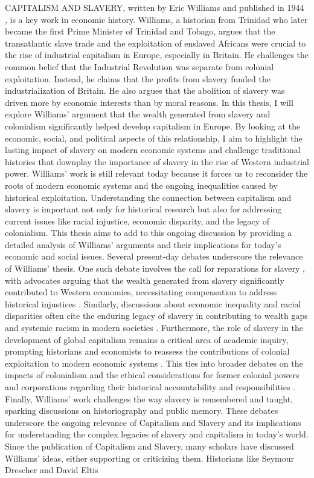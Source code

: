 CAPITALISM AND SLAVERY, written by Eric Williams and published in 1944 , is a key work in economic history. Williams, a historian from Trinidad who later became the first Prime Minister of Trinidad and Tobago, argues that the transatlantic slave trade and the exploitation of enslaved Africans were crucial to the rise of industrial capitalism in Europe, especially in Britain. He challenges the common belief that the Industrial Revolution was separate from colonial exploitation. Instead, he claims that the profits from slavery funded the industrialization of Britain. He also argues that the abolition of slavery was driven more by economic interests than by moral reasons. In this thesis, I will explore Williams' argument that the wealth generated from slavery and colonialism significantly helped develop capitalism in Europe. By looking at the economic, social, and political aspects of this relationship, I aim to highlight the lasting impact of slavery on modern economic systems and challenge traditional histories that downplay the importance of slavery in the rise of Western industrial power. Williams' work is still relevant today because it forces us to reconsider the roots of modern economic systems and the ongoing inequalities caused by historical exploitation. Understanding the connection between capitalism and slavery is important not only for historical research but also for addressing current issues like racial injustice, economic disparity, and the legacy of colonialism. This thesis aims to add to this ongoing discussion by providing a detailed analysis of Williams' arguments and their implications for today's economic and social issues. Several present-day debates underscore the relevance of Williams' thesis. One such debate involves the call for reparations for slavery , with advocates arguing that the wealth generated from slavery significantly contributed to Western economies, necessitating compensation to address historical injustices . Similarly, discussions about economic inequality and racial disparities often cite the enduring legacy of slavery in contributing to wealth gaps and systemic racism in modern societies . Furthermore, the role of slavery in the development of global capitalism remains a critical area of academic inquiry, prompting historians and economists to reassess the contributions of colonial exploitation to modern economic systems . This ties into broader debates on the impacts of colonialism and the ethical considerations for former colonial powers and corporations regarding their historical accountability and responsibilities . Finally, Williams' work challenges the way slavery is remembered and taught, sparking discussions on historiography and public memory. These debates underscore the ongoing relevance of Capitalism and Slavery and its implications for understanding the complex legacies of slavery and capitalism in today's world. Since the publication of Capitalism and Slavery, many scholars have discussed Williams' ideas, either supporting or criticizing them. Historians like Seymour Drescher  and David Eltis 